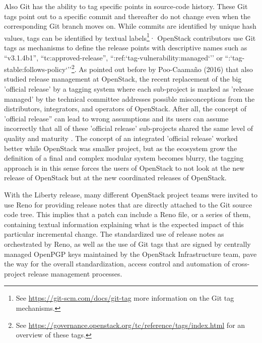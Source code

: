 \documentclass[dvipsnames]{bmcart}
\theoremstyle{definition}
\renewenvironment{newStuff}{}{}
\begin{document}
Also Git has the ability to tag specific points in source-code history. These Git tags point out to a specific commit and thereafter do not change even when the corresponding Git branch moves on. While commits are identified by unique hash values,  tags can be identified by textual labels\footnote{See \url{https://git-scm.com/docs/git-tag} more information on the Git tag mechanisms.}· OpenStack contributors use Git tags as mechanisms to define the release points with descriptive names such as ``v3.1.4b1'', ``tc:approved-release'', ``:ref:`tag-vulnerability:managed`'' or ``:`tag-stable:follows-policy`''\footnote{See \url{https://governance.openstack.org/tc/reference/tags/index.html} for an overview of these tags.}. \begin{newStuff}
As pointed out before by Poo-Caamaño (2016) \cite{poo2016release} that also studied release management at OpenStack, the recent replacement of the big 'official release' by a tagging system where each sub-project is marked as 'release managed' by the technical committee addresses possible misconceptions from the distributors, integrators, and operators of OpenStack. After all, the concept of 'official release” can lead to wrong assumptions and its users can assume incorrectly that all of these 'official release' sub-projects shared the same level of quality and maturity \cite [p111]{poo2016release}. The concept of an integrated 'official release' worked better while OpenStack was smaller project, but as the ecosystem grow the definition of a final and complex modular system  becomes blurry, the tagging approach is in this sense forces the users of OpenStack to not look at the new release of OpenStack but at the new coordinated releases of OpenStack.  
 \end{newStuff}
 




With the Liberty release, many different OpenStack project teams were invited to use Reno for providing release notes that are directly attached to the Git source code tree. This implies that a patch can include a Reno file, or a series of them, containing textual information explaining what is the expected impact of this particular incremental change.  The standardized use of release notes as orchestrated by Reno, as well as the use of Git tags that are signed by centrally managed OpenPGP keys maintained by the OpenStack Infrastructure team, pave the way for the overall standardization, access control  and automation of cross-project release management processes. 
\end{document}
